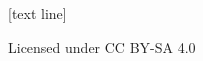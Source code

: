 [text line]{%
  \parbox{\linewidth}{\vspace*{-10pt}Licensed under CC BY-SA 4.0\hfill\insertpagenumber}
}
